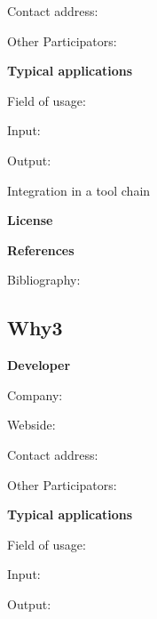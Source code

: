\documentclass{./template/openetcs2}
\begin{document}
	Contact address:

	Other  Participators:



	\textbf{Typical applications}

	Field of usage:


	Input:

	Output:





	Integration in a tool chain



	\textbf{License}


	\textbf{References}

	Bibliography:

\subsection{Why3}

	\textbf{Developer}

	Company: 

	Webside:

	Contact address:

	Other  Participators:



	\textbf{Typical applications}

	Field of usage:


	Input:

	Output:



\end{document}
